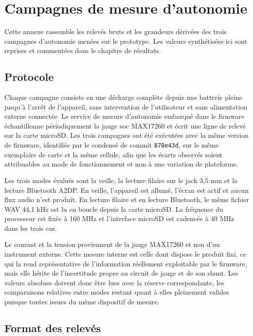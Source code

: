 \chapter{Campagnes de mesure d'autonomie}
\label{ann:autonomie}

Cette annexe rassemble les relevés bruts et les grandeurs dérivées des trois campagnes d'autonomie menées sur le prototype. Les valeurs synthétisées ici sont reprises et commentées dans le chapitre de résultats.

\section{Protocole}
\label{ann:autonomie:protocole}

Chaque campagne consiste en une décharge complète depuis une batterie pleine jusqu'à l'arrêt de l'appareil, sans intervention de l'utilisateur et sans alimentation externe connectée. Le service de mesure d'autonomie embarqué dans le firmware échantillonne périodiquement la jauge \gls{soc} MAX17260 et écrit une ligne de relevé sur la carte microSD. Les trois campagnes ont été exécutées avec la même version de firmware, identifiée par le condensé de commit \texttt{878e43d}, sur le même exemplaire de carte et la même cellule, afin que les écarts observés soient attribuables au mode de fonctionnement et non à une variation de plateforme.

Les trois modes évalués sont la veille, la lecture filaire sur le jack 3,5 mm et la lecture Bluetooth A2DP. En veille, l'appareil est allumé, l'écran est actif et aucun flux audio n'est produit. En lecture filaire et en lecture Bluetooth, le même fichier WAV 44,1 kHz est lu en boucle depuis la carte microSD. La fréquence du processeur est fixée à 160 MHz et l'interface microSD est cadencée à 40 MHz dans les trois cas.

Le courant et la tension proviennent de la jauge MAX17260 et non d'un instrument externe. Cette mesure interne est celle dont dispose le produit fini, ce qui la rend représentative de l'information réellement exploitable par le firmware, mais elle hérite de l'incertitude propre au circuit de jauge et de son shunt. Les valeurs absolues doivent donc être lues avec la réserve correspondante, les comparaisons relatives entre modes restant quant à elles pleinement valides puisque toutes issues du même dispositif de mesure.

\section{Format des relevés}
\label{ann:autonomie:format}

